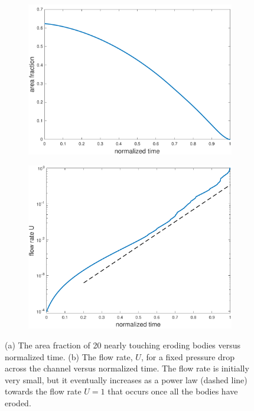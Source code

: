 \documentclass[preprint,10pt]{elsarticle}
\begin{document}
\begin{figure}[H]
\begin{subfigure}[b]{0.5\textwidth}
\includegraphics*[height = 0.7\linewidth]{./figs/porosity20dense}
\caption{}
\end{subfigure}
\begin{subfigure}[b]{0.5\textwidth}
\includegraphics*[height = 0.7\linewidth]{./figs/flow_rate20dense}
\caption{}
\end{subfigure}
\caption{\label{fig:Eroding20flowrate}(a) The area fraction of 20
nearly touching eroding bodies versus normalized time. (b) The flow
rate, $U$, for a fixed pressure drop across the channel versus
normalized time.  The flow rate is initially very small, but it
eventually increases as a power law (dashed line) towards the flow rate
$U=1$ that occurs once all the bodies have eroded.}
\end{figure}
\end{document}
